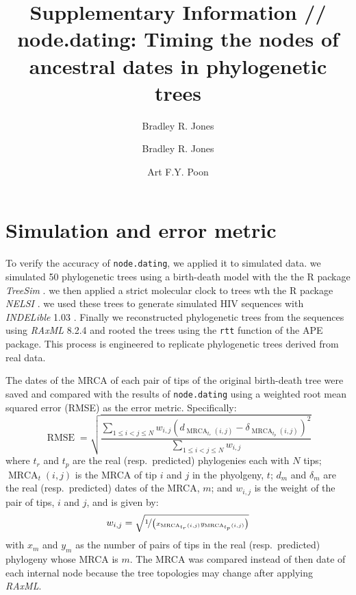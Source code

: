 \documentclass[12pt]{article}
\newcommand{\code}[1]{{\tt #1}}
\begin{document}
\title{Supplementary Information // node.dating: Timing the nodes of ancestral dates in phylogenetic trees}

\author[1,2]{Bradley R. Jones}
\author[1,2,*]{Bradley R. Jones}
\author[2,3]{Art F.Y. Poon}

\date{}

\maketitle

\section{Simulation and error metric} \label{sec:sim}
To verify the accuracy of \code{node.dating}, we applied it to simulated data.
we simulated 50 phylogenetic trees using a birth-death model with the the R package \emph{TreeSim} \citep{TreeSim}.
we then applied a strict molecular clock to trees wth the R package \emph{NELSI} \citep{NELSI}.
we used these trees to generate simulated HIV sequences with \emph{INDELible} 1.03 \citep{Indelible09}.
Finally we reconstructed phylogenetic trees from the sequences using \emph{RAxML} 8.2.4 \citep{Raxml14} and rooted the trees using the \code{rtt} function of the APE package.
This process is engineered to replicate phylogenetic trees derived from real data.

The dates of the MRCA of each pair of tips of the original birth-death tree were saved and compared with the results of \code{node.dating} using a weighted root mean squared error (RMSE) as the error metric.
Specifically:
\[\operatorname{RMSE} = \sqrt{\frac{\sum_{1 \leq i < j \leq N}w_{i,j}\left(d_{\operatorname{MRCA}_{t_r}(i,j)} - \delta_{\operatorname{MRCA}_{t_p}(i,j)}\right)^2}{\sum_{1 \leq i < j \leq N}w_{i,j}}}\]
where $t_r$ and $t_p$ are the real (resp.~predicted) phylogenies each with $N$ tips; $\operatorname{MRCA}_t(i, j)$ is the MRCA of tip $i$ and $j$ in the phyolgeny, $t$; $d_{m}$ and $\delta_m$ are the real (resp.~predicted) dates of the MRCA, $m$; and $w_{i, j}$ is the weight of the pair of tips, $i$ and $j$, and is given by:
\[w_{i, j} = \sqrt{\nicefrac{1}{\left(x_{\operatorname{MRCA}_{t_r}(i,j)}y_{\operatorname{MRCA}_{t_p}(i,j)}\right)}}\]
with $x_m$ and $y_m$ as the number of pairs of tips in the real (resp.~predicted) phylogeny whose MRCA is $m$.
The MRCA was compared instead of then date of each internal node because the tree topologies may change after applying \emph{RAxML}.



\end{document}
